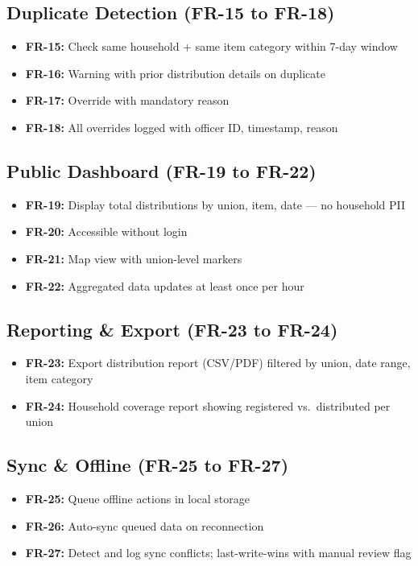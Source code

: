 \subsection{Duplicate Detection (FR-15 to FR-18)}
\begin{itemize}[nosep]
    \item \textbf{FR-15:} Check same household + same item category within 7-day window
    \item \textbf{FR-16:} Warning with prior distribution details on duplicate
    \item \textbf{FR-17:} Override with mandatory reason
    \item \textbf{FR-18:} All overrides logged with officer ID, timestamp, reason
\end{itemize}

\subsection{Public Dashboard (FR-19 to FR-22)}
\begin{itemize}[nosep]
    \item \textbf{FR-19:} Display total distributions by union, item, date --- no household PII
    \item \textbf{FR-20:} Accessible without login
    \item \textbf{FR-21:} Map view with union-level markers
    \item \textbf{FR-22:} Aggregated data updates at least once per hour
\end{itemize}

\subsection{Reporting \& Export (FR-23 to FR-24)}
\begin{itemize}[nosep]
    \item \textbf{FR-23:} Export distribution report (CSV/PDF) filtered by union, date range, item category
    \item \textbf{FR-24:} Household coverage report showing registered vs.\ distributed per union
\end{itemize}

\subsection{Sync \& Offline (FR-25 to FR-27)}
\begin{itemize}[nosep]
    \item \textbf{FR-25:} Queue offline actions in local storage
    \item \textbf{FR-26:} Auto-sync queued data on reconnection
    \item \textbf{FR-27:} Detect and log sync conflicts; last-write-wins with manual review flag
\end{itemize}

